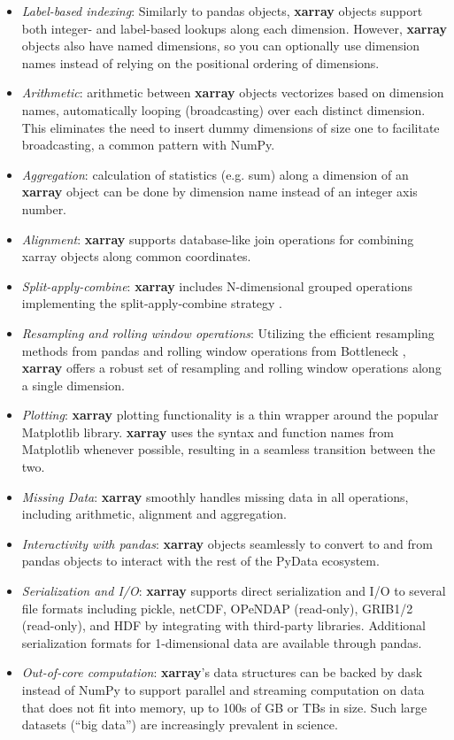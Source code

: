 \documentclass{jors}
\begin{document}
\begin{itemize}
	\item \textit{Label-based indexing}: Similarly to pandas objects, \textbf{xarray} objects support both integer- and label-based lookups along each dimension.
	However, \textbf{xarray} objects also have named dimensions, so you can optionally use dimension names instead of relying on the positional ordering of dimensions.
	\item \textit{Arithmetic}: arithmetic between \textbf{xarray} objects vectorizes based on dimension names, automatically looping (broadcasting) over each distinct dimension. This eliminates the need to insert dummy dimensions of size one to facilitate broadcasting, a common pattern with NumPy.
	\item \textit{Aggregation}: calculation of statistics (e.g. sum) along a dimension of an \textbf{xarray} object can be done by dimension name instead of an integer axis number.
	\item \textit{Alignment}: \textbf{xarray} supports database-like join operations for combining xarray objects along common coordinates.
	\item \textit{Split-apply-combine}: \textbf{xarray} includes N-dimensional grouped operations implementing the split-apply-combine strategy \citep{wickham_2011}.
	\item \textit{Resampling and rolling window operations}: Utilizing the efficient resampling methods from pandas and rolling window operations from Bottleneck \citep{Bottleneck}, \textbf{xarray} offers a robust set of resampling and rolling window operations along a single dimension.
	\item \textit{Plotting}: \textbf{xarray} plotting functionality is a thin wrapper around the popular Matplotlib library.
	\textbf{xarray} uses the syntax and function names from Matplotlib whenever possible, resulting in a seamless transition between the two.
	\item \textit{Missing Data}: \textbf{xarray} smoothly handles missing data in all operations, including arithmetic, alignment and aggregation.
	\item \textit{Interactivity with pandas}: \textbf{xarray} objects seamlessly to convert to and from pandas objects to interact with the rest of the PyData ecosystem.
	\item \textit{Serialization and I/O}: \textbf{xarray} supports direct serialization and I/O to several file formats including pickle, netCDF, OPeNDAP (read-only), GRIB1/2 (read-only), and HDF by integrating with third-party libraries.
	Additional serialization formats for 1-dimensional data are available through pandas.
	\item \textit{Out-of-core computation}: \textbf{xarray}'s data structures can be backed by dask \cite{dask} instead of NumPy to support parallel and streaming computation on data that does not fit into memory, up to 100s of GB or TBs in size. Such large datasets (``big data'') are increasingly prevalent in science.
\end{itemize}
\end{document}
